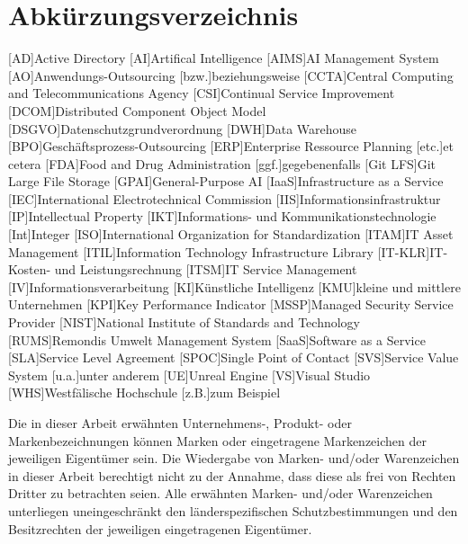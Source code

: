 %
\ClearShipoutPicture
\thispagestyle{empty}
\newpage
{}
\tableofcontents
\restoregeometry

\newpage
\section*{Abkürzungsverzeichnis} 
\begin{acronym}[Bash]
[AD]{Active Directory}
[AI]{Artifical Intelligence}
[AIMS]{AI Management System}
[AO]{Anwendungs-Outsourcing}
[bzw.]{beziehungsweise}
[CCTA]{Central Computing and Telecommunications Agency}
[CSI]{Continual Service Improvement}
[DCOM]{Distributed Component Object Model}
[DSGVO]{Datenschutzgrundverordnung}
[DWH]{Data Warehouse}
[BPO]{Geschäftsprozess-Outsourcing}
[ERP]{Enterprise Ressource Planning}
[etc.]{et cetera}
[FDA]{Food and Drug Administration}
[ggf.]{gegebenenfalls}
[Git LFS]{Git Large File Storage}
[GPAI]{General-Purpose AI}
[IaaS]{Infrastructure as a Service}
[IEC]{International Electrotechnical Commission}
[IIS]{Informationsinfrastruktur}
[IP]{Intellectual Property}
[IKT]{Informations- und Kommunikationstechnologie}
[Int]{Integer}
[ISO]{International Organization for Standardization}
[ITAM]{IT Asset Management}
[ITIL]{Information Technology Infrastructure Library}
[IT-KLR]{IT-Kosten- und Leistungsrechnung}
[ITSM]{IT Service Management}
[IV]{Informationsverarbeitung}
[KI]{Künstliche Intelligenz}
[KMU]{kleine und mittlere Unternehmen}
[KPI]{Key Performance Indicator}
[MSSP]{Managed Security Service Provider}
[NIST]{National Institute of Standards and Technology}
[RUMS]{Remondis Umwelt Management System}
[SaaS]{Software as a Service}
[SLA]{Service Level Agreement}
[SPOC]{Single Point of Contact}
[SVS]{Service Value System}
[u.a.]{unter anderem}
[UE]{Unreal Engine}
[VS]{Visual Studio}
[WHS]{Westfälische Hochschule}
[z.B.]{zum Beispiel}
\end{acronym}
\vfill
Die in dieser Arbeit erwähnten Unternehmens-, Produkt- oder Markenbezeichnungen können Marken oder eingetragene Markenzeichen der jeweiligen Eigentümer sein.
Die Wiedergabe von Marken- und/oder Warenzeichen in dieser Arbeit berechtigt nicht zu der Annahme, dass diese als frei von Rechten Dritter zu betrachten seien.
Alle erwähnten Marken- und/oder Warenzeichen unterliegen uneingeschränkt den länderspezifischen Schutzbestimmungen und den Besitzrechten der jeweiligen eingetragenen Eigentümer.
\newpage

